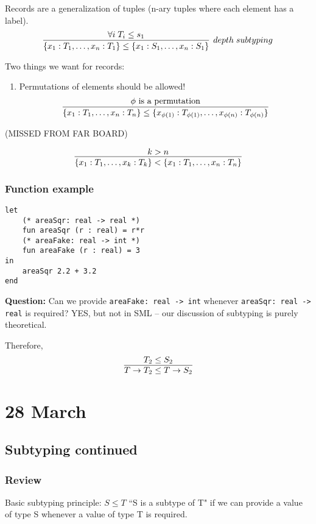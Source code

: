 \documentclass[11pt]{article}
\begin{document}
Records are a generalization of tuples (n-ary tuples where each element has a label).
\[
    \infer[depth \; subtyping]{\{x_1 : T_1, \dots, x_n : T_1 \} \leq \{ x_1 : S_1, \dots, x_n : S_1 \} }{
        \forall i \; T_i \leq s_1
    }
\]

Two things we want for records:
\begin{enumerate}
    \item Permutations of elements should be allowed! \\
        \[
            \infer{ \{ x_1 : T_1, \dots, x_n : T_n\} \leq \{ x_{\phi(1)} : T_{\phi(1)}, \dots, x_{\phi(n)} : T_{\phi(n)} \} }{
                \phi \textnormal{ is a permutation}
            }
        \]
        
\end{enumerate}

(MISSED FROM FAR BOARD)

\[
    \infer{\{x_1 : T_1, \dots, x_k : T_k\} < \{x_1 : T_1, \dots, x_n : T_n\}}{
        k > n
    }
\]

\subsubsection{Function example}
\begin{verbatim}
let
    (* areaSqr: real -> real *)
    fun areaSqr (r : real) = r*r
    (* areaFake: real -> int *)
    fun areaFake (r : real) = 3
in
    areaSqr 2.2 + 3.2
end
\end{verbatim}

\textbf{Question:} Can we provide \verb~areaFake: real -> int~ whenever \verb~areaSqr: real -> real~ is required? YES, but not in SML -- our discussion of subtyping is purely theoretical.

Therefore,
\[
    \infer{T \rightarrow T_2 \leq T \rightarrow S_2}{T_2 \leq S_2}
\]

\section{28 March}
\subsection{Subtyping continued}
\subsubsection{Review}
Basic subtyping principle: $S \leq T$ ``S is a subtype of T" if we can provide a value of type S whenever a value of type T is required. 
\end{document}
